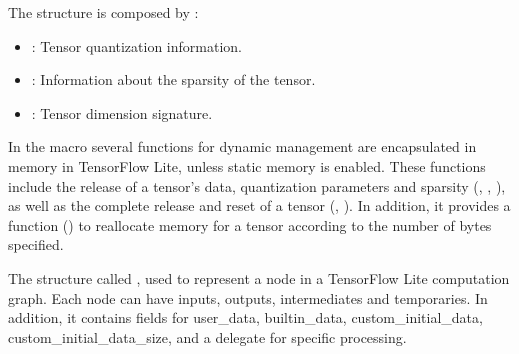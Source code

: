 \begin{center}
    \label{Figure:Comatibily}
\end{center}

The structure is composed by : 

\begin{itemize}
    \item {}: Tensor quantization information.
    \item {}: Information about the sparsity of the tensor.
    \item {}: Tensor dimension signature.		
\end{itemize}		

\begin{center}
    \label{Figure:Comatibily}
\end{center}

In the macro  several functions for dynamic management are encapsulated in memory in TensorFlow Lite, unless static memory is enabled. These functions include the release of a tensor's data, quantization parameters and sparsity (, , ), as well as the complete release and reset of a tensor (, ). In addition, it provides a function () to reallocate memory for a tensor according to the number of bytes specified.

\begin{center}
    \label{Figure:Comatibily}
\end{center}

The structure called , used to represent a node in a TensorFlow Lite computation graph. Each node can have inputs, outputs, intermediates and temporaries. In addition, it contains fields for user\_data, builtin\_data, custom\_initial\_data, custom\_initial\_data\_size, and a delegate for specific processing.

